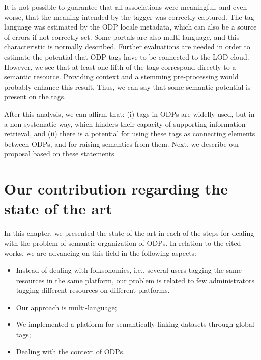

It is not possible to guarantee that all associations were meaningful, and even worse, that the meaning intended by the tagger was correctly captured.
The tag language was estimated by the ODP locale metadata, which can also be a source of errors if not correctly set.
Some portals are also multi-language, and this characteristic is normally described.
Further evaluations are needed in order to estimate the potential that ODP tags have to be connected to the LOD cloud.
However, we see that at least one fifth of the tags correspond directly to a semantic resource.
Providing context and a stemming pre-processing would probably enhance this result.
Thus, we can say that some semantic potential is present on the tags.

\hspace{0.2pt}

After this analysis, we can affirm that: (i) tags in ODPs are widelly used, but in a non-systematic way, which hinders their capacity of supporting information retrieval, and (ii) there is a potential for using these tags as connecting elements between ODPs, and for raising semantics from them.
Next, we describe our proposal based on these statements.


\section{Our contribution regarding the state of the art}

In this chapter, we presented the state of the art in each of the steps for dealing with the problem of semantic organization of ODPs.
In relation to the cited works, we are advancing on this field in the following aspects:
\begin{itemize}
	\item Instead of dealing with folksonomies, i.e., several users tagging the same resources in the same platform, our problem is related to few administrators tagging different resources on different platforms.
	\item Our approach is multi-language;
	\item We implemented a platform for semantically linking datasets through global tags;
	\item Dealing with the context of ODPs.
\end{itemize}

